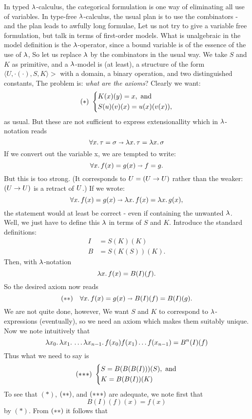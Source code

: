 In typed $\l$-calculus, the categorical formulation is one way of eliminating all use of variables. In type-free $\l$-calculus, the usual plan is to use the combinators - and the plan leads to awfully long formulae, Let us not try to give a variable free formulation, but talk in terms of first-order models.
What is unalgebraic in the model definition is the $\l$-operator, since a bound variable is of the essence of the use of $\l$, So let us replace $\l$ by the combinators in the usual way. We take $S$ and $K$ as primitive, and a $\l$-model is (at least), a structure of the form $\langle U, \cdot(\cdot), S, K\rangle>$ with a domain, a binary operation, and two distinguished constants, The problem is: {\it what are the axioms}? Clearly we want:
%
\[
(*) \,\,
\begin{dcases}
K(x)(y) = x, {\textrm { and}}\\
S(u)(v)(x) = u(x)(v(x)),
\end{dcases}
\]
%
as usual. But these are not sufficient to express extensionallity which in $\l$-notation reads
$$
\forall x.\, \tau = \sigma \imp \lm{x}. \tau = \lm{x}. \sigma
$$
If we convert out the variable x, we are tempted to write:
$$
\forall x.\, f(x) = g(x) \imp f = g.
$$
But this is too strong. (It corresponds to $\U = (\U \to \U)$ rather than the weaker: $(\U \to \U)$ is a retract of $\U$.) If we wrote:
$$
\forall x.\, f(x) = g(x) \imp \lm{x}.f(x) = \lm{x}.g(x),
$$
the statement would at least be correct - even if containing the unwanted $\l$. Well, we just have to define this $\l$ in terms of $S$ and $K$. Introduce the standard definitions:
\begin{align*}
I &= S(K)(K)\\
B &= S(K(S))(K).
\end{align*}
%
Then, with $\l$-notation
$$
\lm{x}.f(x) = B(I)(f).
$$
So the desired axiom now reads
$$
({\mathrm {**}}) \quad \forall x.\, f(x) = g(x) \imp B(I)(f) = B(I)(g).
$$
We are not quite done, however, We want $S$ and $K$ to correspond to $\l$-expressions (eventually), so we need an axiom which makes them suitably unique. Now we note intuitively that
$$
\lm{x_0}. \lm{x_1}. \dots \lm{x_{n-1}}. f(x_0)f(x_1)\dots f(x_{n-1}) = B^n(I)(f)
$$
Thus what we need to say is
\[
\sss \,\,
\begin{dcases}
S = B(B(B(I)))(S), {\textrm { and}}\\
K = B(B(I))(K)
\end{dcases}
\]
To see that $(*)$, $\ss$, and $\sss$ are adequate, we note first that
$$
B(I)(f)(x) = f(x)
$$
by $(*)$. From $\ss$ it follows that
